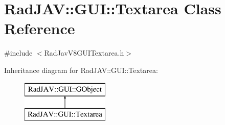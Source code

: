 \hypertarget{class_rad_j_a_v_1_1_g_u_i_1_1_textarea}{}\section{Rad\+J\+AV\+:\+:G\+UI\+:\+:Textarea Class Reference}
\label{class_rad_j_a_v_1_1_g_u_i_1_1_textarea}


{\ttfamily \#include $<$Rad\+Jav\+V8\+G\+U\+I\+Textarea.\+h$>$}

Inheritance diagram for Rad\+J\+AV\+:\+:G\+UI\+:\+:Textarea\+:\begin{figure}[H]
\begin{center}
\leavevmode
\includegraphics[height=2.000000cm]{class_rad_j_a_v_1_1_g_u_i_1_1_textarea}
\end{center}
\end{figure}
